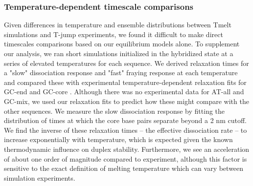 \documentclass[journal=jpcbfk,manuscript=article]{achemso}
\begin{document}
\subsubsection{\label{sec:Results}Temperature-dependent timescale comparisons}


Given differences in temperature and ensemble distributions between Tmelt simulations and T-jump experiments, we found it difficult to make direct timescales comparisons based on our equilibrium models alone. To supplement our analysis, we ran short simulations initialized in the hybridized state at a series of elevated temperatures for each sequence. We derived relaxation times for a "slow" dissociation response and "fast" fraying response at each temperature and compared these with experimental temperature-dependent relaxation fits for GC-end and GC-core \citep{Sanstead2018DirectDehybridization}. Although there was no experimental data for AT-all and GC-mix, we used our relaxation fits to predict how these might compare with the other sequences. We measure the slow dissociation response by fitting the distribution of times at which the core base pairs separate beyond a 2 nm cutoff. We find the inverse of these relaxation times -- the effective dissociation rate -- to increase exponentially with temperature, which is expected given the known thermodynamic influence on duplex stability. Furthermore, we see an acceleration of about one order of magnitude compared to experiment, although this factor is sensitive to the exact definition of melting temperature which can vary between simulation experiments. 
\end{document}
